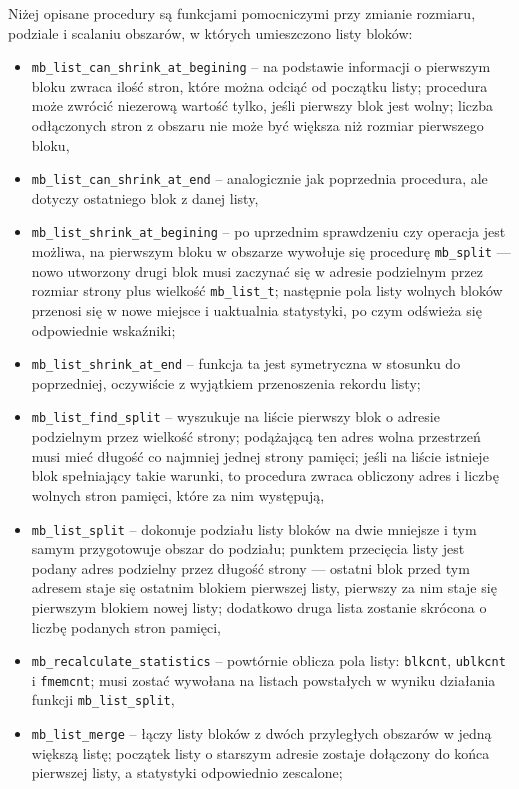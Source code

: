 \documentclass[12pt,a4paper,titlepage,twoside]{mwart}
\begin{document}
Niżej opisane procedury są funkcjami pomocniczymi przy zmianie rozmiaru,
podziale i scalaniu obszarów, w których umieszczono listy bloków:
\begin{itemize}
\item \verb+mb_list_can_shrink_at_begining+ -- na podstawie informacji o
pierwszym bloku zwraca ilość stron, które można odciąć od początku listy;
procedura może zwrócić niezerową wartość tylko, jeśli pierwszy blok jest wolny;
liczba odłączonych stron z obszaru nie może być większa niż rozmiar pierwszego
bloku,
\item \verb+mb_list_can_shrink_at_end+ -- analogicznie jak poprzednia
procedura, ale dotyczy ostatniego blok z danej listy,
\item \verb+mb_list_shrink_at_begining+ -- po uprzednim sprawdzeniu czy
operacja jest możliwa, na pierwszym bloku w obszarze wywołuje się procedurę
\verb+mb_split+ --- nowo utworzony drugi blok musi zaczynać się w adresie
podzielnym przez rozmiar strony plus wielkość \verb+mb_list_t+; następnie pola
listy wolnych bloków przenosi się w nowe miejsce i uaktualnia statystyki, po
czym odświeża się odpowiednie wskaźniki;
\item \verb+mb_list_shrink_at_end+ -- funkcja ta jest symetryczna w stosunku do
poprzedniej, oczywiście z wyjątkiem przenoszenia rekordu listy;
\item \verb+mb_list_find_split+ -- wyszukuje na liście pierwszy blok o adresie
podzielnym przez wielkość strony; podążającą ten adres wolna przestrzeń musi
mieć długość co najmniej jednej strony pamięci; jeśli na liście istnieje blok
spełniający takie warunki, to procedura zwraca obliczony adres i liczbę wolnych
stron pamięci, które za nim występują,
\item \verb+mb_list_split+ -- dokonuje podziału listy bloków na dwie mniejsze i
tym samym przygotowuje obszar do podziału; punktem przecięcia listy jest podany
adres podzielny przez długość strony --- ostatni blok przed tym adresem staje
się ostatnim blokiem pierwszej listy, pierwszy za nim staje się pierwszym
blokiem nowej listy; dodatkowo druga lista zostanie skrócona o liczbę podanych
stron pamięci,
\item \verb+mb_recalculate_statistics+ -- powtórnie oblicza pola listy:
\verb+blkcnt+, \verb+ublkcnt+ i \verb+fmemcnt+; musi zostać wywołana
na listach powstałych w wyniku działania funkcji \verb+mb_list_split+,
\item \verb+mb_list_merge+ -- łączy listy bloków z dwóch przyległych obszarów w
jedną większą listę; początek listy o starszym adresie zostaje dołączony do
końca pierwszej listy, a statystyki odpowiednio zescalone;
\end{itemize}
\end{document}
